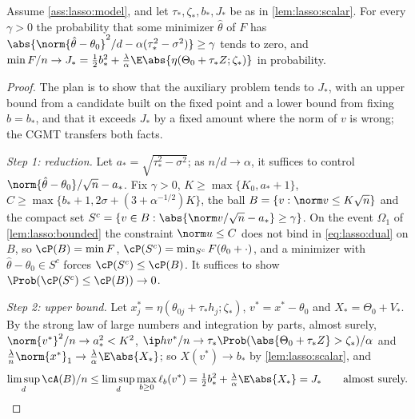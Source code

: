\begin{refsection}
\begin{theorem}\label{thm:lasso:cgmt}
Assume \cref{ass:lasso:model}, and let $\tau_*,\zeta_*,b_*,J_*$ be as in \cref{lem:lasso:scalar}. For every $\gamma>0$ the probability that some minimizer $\hat\theta$ of $F$ has $\abs{\norm{\hat\theta-\theta_0}^2/d-\alpha(\tau_*^2-\sigma^2)}\ge\gamma$ tends to zero, and $\min F/n\to J_*=\frac12b_*^2+\frac\lambda\alpha\E\abs{\eta(\Theta_0+\tau_*Z;\zeta_*)}$ in probability.
\end{theorem}

\begin{proof}
The plan is to show that the auxiliary problem tends to $J_*$, with an upper bound from a candidate built on the fixed point and a lower bound from fixing $b=b_*$, and that it exceeds $J_*$ by a fixed amount where the norm of $v$ is wrong; the CGMT transfers both facts.

\emph{Step 1: reduction.} Let $a_*=\sqrt{\tau_*^2-\sigma^2}$; as $n/d\to\alpha$, it suffices to control $\norm{\hat\theta-\theta_0}/\sqrt n-a_*$. Fix $\gamma>0$, $K\ge\max\{K_0,a_*+1\}$, $C\ge\max\{b_*+1,2\sigma+(3+\alpha^{-1/2})K\}$, the ball $B=\{v:\norm v\le K\sqrt n\}$ and the compact set $S^c=\{v\in B:\abs{\norm v/\sqrt n-a_*}\ge\gamma\}$. On the event $\Omega_1$ of \cref{lem:lasso:bounded} the constraint $\norm u\le C$ does not bind in \eqref{eq:lasso:dual} on $B$, so $\cP(B)=\min F$, $\cP(S^c)=\min_{S^c}F(\theta_0+\cdot)$, and a minimizer with $\hat\theta-\theta_0\in S^c$ forces $\cP(S^c)\le\cP(B)$. It suffices to show $\Prob(\cP(S^c)\le\cP(B))\to0$.

\emph{Step 2: upper bound.} Let $x^*_j=\eta(\theta_{0j}+\tau_*h_j;\zeta_*)$, $v^*=x^*-\theta_0$ and $X_*=\Theta_0+V_*$. By the strong law of large numbers and integration by parts, almost surely, $\norm{v^*}^2/n\to a_*^2<K^2$, $\ip h{v^*}/n\to\tau_*\Prob(\abs{\Theta_0+\tau_*Z}>\zeta_*)/\alpha$ and $\frac\lambda n\norm{x^*}_1\to\frac\lambda\alpha\E\abs{X_*}$; so $X(v^*)\to b_*$ by \cref{lem:lasso:scalar}, and
\[
\limsup_d\cA(B)/n\le\limsup_d\max_{b\ge0}\ell_b(v^*)=\tfrac12b_*^2+\tfrac\lambda\alpha\E\abs{X_*}=J_*\qquad\text{almost surely.}
\]


\end{proof}
\end{refsection}

